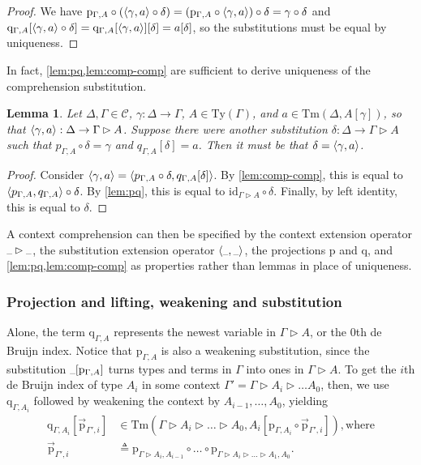 \documentclass{article}
\renewcommand{\_}{\textrm{\textscale{.5}{\textunderscore}}}
\DeclarePairedDelimiter{\ctxt}{\langle}{\rangle}
\newcommand{\Tm}{\mathrm{Tm}}
\newcommand{\Ty}{\mathrm{Ty}}
\newcommand{\id}{\mathrm{id}}
\newcommand{\p}{\mathrm{p}}
\newcommand{\q}{\mathrm{q}}
\theoremstyle{definition}
\theoremstyle{plain}
\newtheorem{lemma}[definition]{Lemma}
\begin{document}
\begin{proof} 
We have $\p_{\Gamma, A} \circ (\ctxt{\gamma, a} \circ \delta) = (\p_{\Gamma, A} \circ \ctxt{\gamma, a}) \circ \delta = \gamma \circ \delta$
and $\q_{\Gamma, A}[\ctxt{\gamma, a} \circ \delta] = \q_{\Gamma, A}[\ctxt{\gamma, a}][\delta] = a[\delta]$,
so the substitutions must be equal by uniqueness.
\end{proof}

In fact, \cref{lem:pq,lem:comp-comp} are sufficient to derive uniqueness of the comprehension substitution.

\begin{lemma}
Let $\Delta, \Gamma \in \mathcal{C}$, $\gamma : \Delta \to \Gamma$,
$A \in \Ty(\Gamma)$, and $a \in \Tm(\Delta, A[\gamma])$,
so that $\ctxt{\gamma, a} : \Delta \to \Gamma \rhd A$.
Suppose there were another substitution $\delta : \Delta \to \Gamma \rhd A$
such that $p_{\Gamma, A} \circ \delta = \gamma$
and $q_{\Gamma, A}[\delta] = a$.
Then it must be that $\delta = \ctxt{\gamma, a}$.
\end{lemma}

\begin{proof}
Consider $\ctxt{\gamma, a} = \ctxt{p_{\Gamma, A} \circ \delta, q_{\Gamma, A}[\delta]}$.
By \cref{lem:comp-comp}, this is equal to $\ctxt{p_{\Gamma, A}, q_{\Gamma, A}} \circ \delta$.
By \cref{lem:pq}, this is equal to $\id_{\Gamma \rhd A} \circ \delta$.
Finally, by left identity, this is equal to $\delta$.
\end{proof}

A context comprehension can then be specified by the context extension operator $\_\rhd\_$,
the substitution extension operator $\ctxt{\_, \_}$,
the projections $\p$ and $\q$,
and \cref{lem:pq,lem:comp-comp} as properties rather than lemmas in place of uniqueness.

\subsubsection{Projection and lifting, weakening and substitution}

Alone, the term $\q_{\Gamma, A}$ represents the newest variable in $\Gamma \rhd A$,
or the 0th de Bruijn index.
Notice that $\p_{\Gamma, A}$ is also a weakening substitution,
since the substitution $\_[\p_{\Gamma, A}]$ turns types and terms in $\Gamma$
into ones in $\Gamma \rhd A$.
To get the $i$th de Bruijn index of type $A_i$ in some context $\Gamma' = \Gamma \rhd A_i \rhd \dots A_0$, then,
we use $\q_{\Gamma, A_i}$ followed by weakening the context by $A_{i - 1}, \dots, A_0$, yielding
\begin{align*}
    \q_{\Gamma, A_i}[\vec{\p}_{\Gamma', i}] &\in \Tm(\Gamma \rhd A_i \rhd \dots \rhd A_0, A_i[\p_{\Gamma, A_i} \circ \vec{\p}_{\Gamma', i}]), \textrm{where} \\
    \vec{\p}_{\Gamma', i} &\triangleq \p_{\Gamma \rhd A_i, A_{i-1}} \circ \dots \circ \p_{\Gamma \rhd A_i \rhd \dots \rhd A_1, A_0}.
\end{align*}
\end{document}
